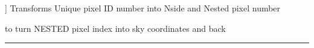 \begin{related}
  \begin{sulist}{} %
  \item[\htmlref{uniq2nest}{sub:uniq2nest}] ] Transforms  Unique \healpix pixel ID number into Nside and Nested pixel number
  \item[\htmlref{pix2xxx, ...}{sub:pix_tools}] to turn NESTED pixel index into sky coordinates and back
  \end{sulist}
\end{related}

\rule{\hsize}{2mm}

